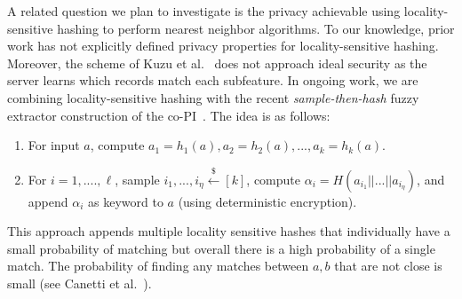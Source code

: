  A related question we plan to investigate is the privacy achievable using locality-sensitive hashing to perform nearest neighbor algorithms.  To our knowledge, prior work has not explicitly defined privacy properties for locality-sensitive hashing.  Moreover, the scheme of Kuzu et al.~\cite{kuzu2012efficient}  does not approach ideal security as the server learns which records match each subfeature.  In ongoing work, we are combining locality-sensitive hashing with the recent \emph{sample-then-hash} fuzzy extractor construction of the co-PI~\cite{EC:CFPRS16}.  The idea is as follows:

\begin{enumerate}\setlength\itemsep{0em}
\item For input $a$, compute $a_1 = h_1(a), a_2 = h_2(a),..., a_k = h_k(a)$.
\item For $i=1,...., \ell$,
sample $i_1,..., i_\eta\overset{\$}\leftarrow [k]$, compute $\alpha_i =
H(a_{i_1} || ... || a_{i_\eta})$, and append $\alpha_i$ as keyword to $a$
(using deterministic encryption).
\end{enumerate}
\noindent
This approach appends multiple locality sensitive hashes that individually have a small probability of matching but overall there is a high probability of a single match.  The probability of finding any matches between $a,b$ that are not close is small (see Canetti et al.~\cite{EC:CFPRS16}).
%
